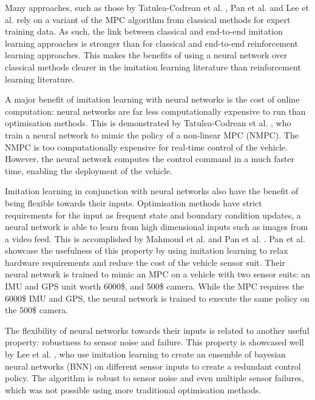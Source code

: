 Many approaches, such as those by Tatulea-Codrean et al. \cite{Tatulea-Codrean2020}, Pan et al. \cite{Pan2017a} and Lee et al. \cite{lee2019} rely on a variant of the MPC algorithm from classical methods for expert training data. 
As such, the link between classical and end-to-end imitation learning approaches is stronger than for classical and end-to-end reinforcement learning approaches.
This makes the benefits of using a neural network over classical methods clearer in the imitation learning literature than reinforcement learning literature.

A major benefit of imitation learning with neural networks is the cost of online computation: neural networks are far less computationally expensive to run than optimisation methods. This is demonstrated by Tatulea-Codrean et al. \cite{Tatulea-Codrean2020}, who train a neural network to mimic the policy of a non-linear MPC (NMPC). The NMPC is too computationally expensive for real-time control of the vehicle. 
However, the neural network computes the control command in a much faster time, enabling the deployment of the vehicle.

Imitation learning in conjunction with neural networks also have the benefit of being flexible towards their inputs. 
Optimisation methods have strict requirements for the input as frequent state and boundary condition updates, a neural network is able to learn from high dimensional inputs such as images from a video feed. 
This is accomplished by Mahmoud et al. \cite{Mahmoud2020} and Pan et al. \cite{Pan2017a}. 
Pan et al. \cite{Pan2017a} showcase the usefulness of this property by using imitation learning to relax hardware requirements and reduce the cost of the vehicle sensor suit. 
Their neural network is trained to mimic an MPC on a vehicle with two sensor suits: an IMU and GPS unit worth 6000\$, and 500\$ camera.
While the MPC requires the 6000\$ IMU and GPS, the neural network is trained to execute the same policy on the 500\$ camera.

The flexibility of neural networks towards their inputs is related to another useful property: robustness to sensor noise and failure. 
This property is showcased well by Lee et al. \cite{lee2019}, who use imitation learning to create an ensemble of bayesian neural networks (BNN) on different sensor inputs to create a redundant control policy. 
The algorithm is robust to sensor noise and even multiple sensor failures, which was not possible using more traditional optimisation methods.

